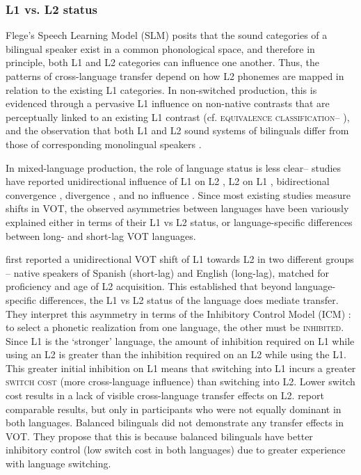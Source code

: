 \documentclass[12 pt]{article}
\begin{document}
\subsubsection*{L1 vs. L2 status} 
Flege's Speech Learning Model (SLM) \citeyearpar{flege1995second,flege2007language} posits that the sound categories of a bilingual speaker exist in a common phonological space, and therefore in principle, both L1 and L2 categories can influence one another. Thus, the patterns of cross-language transfer depend on how L2 phonemes are mapped in relation to the existing L1 categories. In non-switched production, this is evidenced through a pervasive L1 influence on non-native contrasts that are perceptually linked to an existing L1 contrast (cf. \textsc{equivalence classification}-- \cite{flege1984limits,flege1987production}), and the observation that both L1 and L2 sound systems of bilinguals differ from those of corresponding monolingual speakers \citep[e.g.][]{guion2003vowel}. 

In mixed-language production, the role of language status is less clear-- studies have reported unidirectional influence of L1 on L2 \citep{balukas2015spanish,antoniou2011inter,vsimavckova2015immediate,goldrick2014language}, L2 on L1 \citep{tsui2019impact,elias2017effects, olson2013bilingual}, bidirectional convergence \citep{bullock2009trying, olson2016role}, divergence \citep{bullock2009trying,vsimavckova2018patterns}, and no influence \citep{muldner2019phonetics,schwartz2015language}. Since most existing studies measure shifts in VOT, the observed asymmetries between languages have been variously explained either in terms of their L1 vs L2 status, or language-specific differences between long- and short-lag VOT languages. %

\cite{olson2013bilingual} first reported a unidirectional VOT shift of L1 towards L2 in two different groups -- native speakers of Spanish (short-lag) and English (long-lag), matched for proficiency and age of L2 acquisition. This established that beyond language-specific differences, the L1 vs L2 status of the language does mediate transfer. They interpret this asymmetry in terms of the Inhibitory Control Model (ICM) \citep{green1998mental}: to select a phonetic realization from one language, the other must be \textsc{inhibited}. Since L1 is the `stronger' language, the amount of inhibition required on L1 while using an L2 is greater than the inhibition required on an L2 while using the L1. This greater initial inhibition on L1 means that switching into L1 incurs a greater \textsc{switch cost} (more cross-language influence) than switching into L2. Lower switch cost results in a lack of visible cross-language transfer effects on L2. \cite{tsui2019impact} report comparable results, but only in participants who were not equally dominant in both languages. Balanced bilinguals did not demonstrate any transfer effects in VOT. They propose that this is because balanced bilinguals have better inhibitory control (low switch cost in both languages) due to greater experience with language switching.
\end{document}
